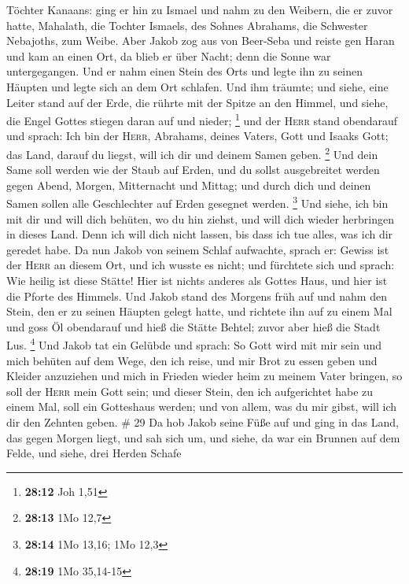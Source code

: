 Töchter Kanaans:  ging er hin zu Ismael und nahm zu den
Weibern, die er zuvor hatte, Mahalath, die Tochter Ismaels, des Sohnes
Abrahams, die Schwester Nebajoths, zum Weibe.  Aber Jakob
zog aus von Beer-Seba und reiste gen Haran  und kam an
einen Ort, da blieb er über Nacht; denn die Sonne war untergegangen. Und
er nahm einen Stein des Orts und legte ihn zu seinen Häupten und legte
sich an dem Ort schlafen.  Und ihm träumte; und siehe,
eine Leiter stand auf der Erde, die rührte mit der Spitze an den Himmel,
und siehe, die Engel Gottes stiegen daran auf und nieder; \footnote{\textbf{28:12}
  Joh 1,51}  und der \textsc{Herr} stand obendarauf und
sprach: Ich bin der \textsc{Herr}, Abrahams, deines Vaters, Gott und
Isaaks Gott; das Land, darauf du liegst, will ich dir und deinem Samen
geben. \footnote{\textbf{28:13} 1Mo 12,7}  Und dein Same
soll werden wie der Staub auf Erden, und du sollst ausgebreitet werden
gegen Abend, Morgen, Mitternacht und Mittag; und durch dich und deinen
Samen sollen alle Geschlechter auf Erden gesegnet werden. \footnote{\textbf{28:14}
  1Mo 13,16; 1Mo 12,3}  Und siehe, ich bin mit dir und
will dich behüten, wo du hin ziehst, und will dich wieder herbringen in
dieses Land. Denn ich will dich nicht lassen, bis dass ich tue alles,
was ich dir geredet habe.  Da nun Jakob von seinem Schlaf
aufwachte, sprach er: Gewiss ist der \textsc{Herr} an diesem Ort, und
ich wusste es nicht;  und fürchtete sich und sprach: Wie
heilig ist diese Stätte! Hier ist nichts anderes als Gottes Haus, und
hier ist die Pforte des Himmels.  Und Jakob stand des
Morgens früh auf und nahm den Stein, den er zu seinen Häupten gelegt
hatte, und richtete ihn auf zu einem Mal und goss Öl obendarauf
 und hieß die Stätte Behtel; zuvor aber hieß die Stadt
Lus. \footnote{\textbf{28:19} 1Mo 35,14-15}  Und Jakob
tat ein Gelübde und sprach: So Gott wird mit mir sein und mich behüten
auf dem Wege, den ich reise, und mir Brot zu essen geben und Kleider
anzuziehen  und mich in Frieden wieder heim zu meinem
Vater bringen, so soll der \textsc{Herr} mein Gott sein; 
und dieser Stein, den ich aufgerichtet habe zu einem Mal, soll ein
Gotteshaus werden; und von allem, was du mir gibst, will ich dir den
Zehnten geben. \# 29  Da hob Jakob seine Füße auf und ging
in das Land, das gegen Morgen liegt,  und sah sich um, und
siehe, da war ein Brunnen auf dem Felde, und siehe, drei Herden Schafe
